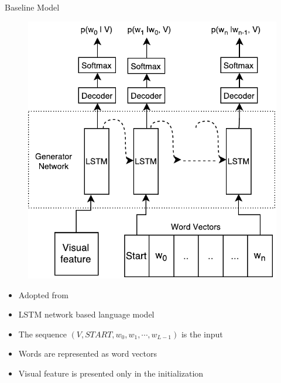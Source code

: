\documentclass{beamer}
\begin{document}
\begin{frame}{Baseline Model}
    \begin{figure}[h]
        \centering
        \includegraphics[width=0.4\linewidth]{images/Thesis_lstmLangGen.pdf}
    \end{figure}
    \begin{itemize}
        \item Adopted from~\cite{Vinyals_2015_CVPR} 
        \item LSTM network based language model
        \item The sequence $(V,START,w_0, w_1, \cdots,w_{L-1})$ is the input
        \item Words are represented as word vectors 
        \item Visual feature is presented only in the initialization 
    \end{itemize}
\end{frame}
\end{document}
